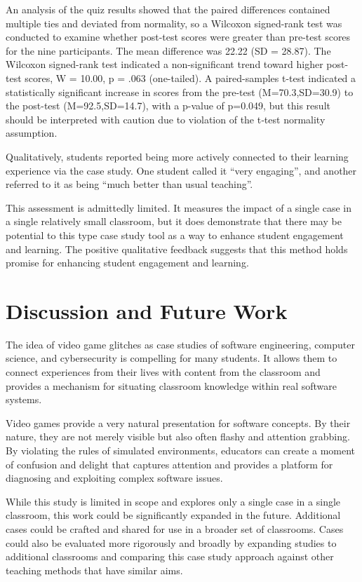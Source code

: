 \documentclass[letterpaper]{article}
\begin{document}
An analysis of the quiz results showed that the paired differences contained multiple ties and deviated from normality, so a Wilcoxon signed-rank test was conducted to examine whether post-test scores were greater than pre-test scores for the nine participants. The mean difference was 22.22 (SD = 28.87). The Wilcoxon signed-rank test indicated a non-significant trend toward higher post-test scores, W = 10.00, p = .063 (one-tailed). A paired-samples t-test indicated a statistically significant increase in scores from the pre-test (M=70.3,SD=30.9) to the post-test (M=92.5,SD=14.7), with a p-value of p=0.049, but this result should be interpreted with caution due to violation of the t‑test normality assumption.

Qualitatively, students reported being more actively connected to their learning experience via the case study. One student called it ``very engaging'', and another referred to it as being ``much better than usual teaching''.

This assessment is admittedly limited. It measures the impact of a single case in a single relatively small classroom, but it does demonstrate that there may be potential to this type case study tool as a way to enhance student engagement and learning. The positive qualitative feedback suggests that this method holds promise for enhancing student engagement and learning.

\section{Discussion and Future Work}

The idea of video game glitches as case studies of software engineering, computer science, and cybersecurity is compelling for many students. It allows them to connect experiences from their lives with content from the classroom and provides a mechanism for situating classroom knowledge within real software systems.

Video games provide a very natural presentation for software concepts. By their nature, they are not merely visible but also often flashy and attention grabbing. By violating the rules of simulated environments, educators can create a moment of confusion and delight that captures attention and provides a platform for diagnosing and exploiting complex software issues.

While this study is limited in scope and explores only a single case in a single classroom, this work could be significantly expanded in the future. Additional cases could be crafted and shared for use in a broader set of classrooms. Cases could also be evaluated more rigorously and broadly by expanding studies to additional classrooms and comparing this case study approach against other teaching methods that have similar aims.

%
%

\printbibliography
\end{document}
